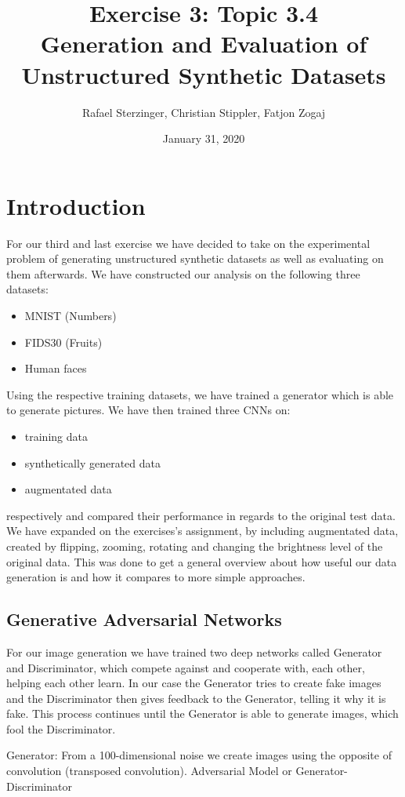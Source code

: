 \documentclass{article}
\title{Exercise 3: Topic 3.4\\ Generation and Evaluation of Unstructured Synthetic Datasets}
\author{Rafael Sterzinger, Christian Stippler, Fatjon Zogaj}
\date{January 31, 2020}
\begin{document}
\maketitle

\section{Introduction}
For our third and last exercise we have decided to take on the experimental problem of generating unstructured synthetic datasets as well as evaluating on them afterwards.
We have constructed our analysis on the following three datasets:
\begin{itemize}
    \item MNIST (Numbers)
    \item FIDS30 (Fruits)
    \item Human faces
\end{itemize}
Using the respective training datasets, we have trained a generator which is able to generate pictures.
We have then trained three CNNs on:
\begin{itemize}
    \item training data
    \item synthetically generated data
    \item augmentated data
\end{itemize}
respectively and compared their performance in regards to the original test data. We have expanded on the exercises's assignment, by
including augmentated data, created by flipping, zooming, rotating and changing the brightness level of the original data.
This was done to get a general overview about how useful our data generation is and how it compares to more simple approaches.

\subsection{Generative Adversarial Networks}
For our image generation we have trained two deep networks called Generator and Discriminator, which compete against and cooperate with, each other,
helping each other learn. In our case the Generator tries to create fake images and the Discriminator then gives feedback to the Generator,
telling it why it is fake. This process continues until the Generator is able to generate images, which fool the Discriminator.

Generator: From a 100-dimensional noise we create images using the opposite of convolution (transposed convolution).
Adversarial Model or Generator-Discriminator
\end{document}
